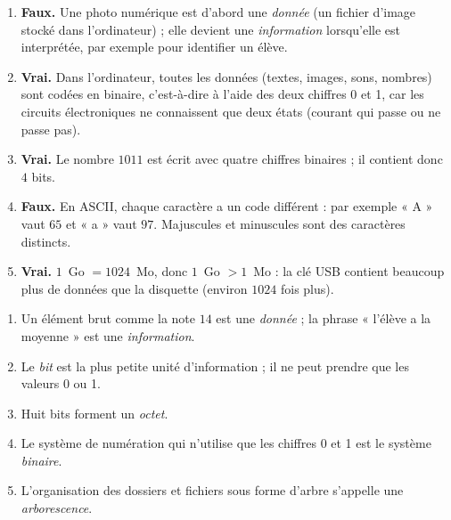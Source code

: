 \documentclass[11pt]{article}
\newcommand{\cle}[1]{{\popxbold\color{popdark}#1}}
\begin{document}
\begin{corrige}
\begin{enumerate}
\item \textbf{Faux.} Une photo numérique est d'abord une \emph{donnée} (un fichier d'image stocké dans l'ordinateur) ; elle devient une \emph{information} lorsqu'elle est interprétée, par exemple pour identifier un élève.
\item \textbf{Vrai.} Dans l'ordinateur, toutes les données (textes, images, sons, nombres) sont codées en \cle{binaire}, c'est-à-dire à l'aide des deux chiffres 0 et 1, car les circuits électroniques ne connaissent que deux états (courant qui passe ou ne passe pas).
\item \textbf{Vrai.} Le nombre $1011$ est écrit avec quatre chiffres binaires ; il contient donc $4$ bits.
\item \textbf{Faux.} En ASCII, chaque caractère a un code différent : par exemple « A » vaut $65$ et « a » vaut $97$. Majuscules et minuscules sont des caractères distincts.
\item \textbf{Vrai.} $1$~Go $= 1024$~Mo, donc $1$~Go $> 1$~Mo : la clé USB contient beaucoup plus de données que la disquette (environ $1024$ fois plus).
\end{enumerate}
\end{corrige}

\begin{corrige}
\begin{enumerate}
\item Un élément brut comme la note $14$ est une \emph{donnée} ; la phrase « l'élève a la moyenne » est une \emph{information}.
\item Le \emph{bit} est la plus petite unité d'information ; il ne peut prendre que les valeurs 0 ou 1.
\item Huit bits forment un \emph{octet}.
\item Le système de numération qui n'utilise que les chiffres 0 et 1 est le système \emph{binaire}.
\item L'organisation des dossiers et fichiers sous forme d'arbre s'appelle une \emph{arborescence}.
\end{enumerate}
\end{corrige}
\end{document}
